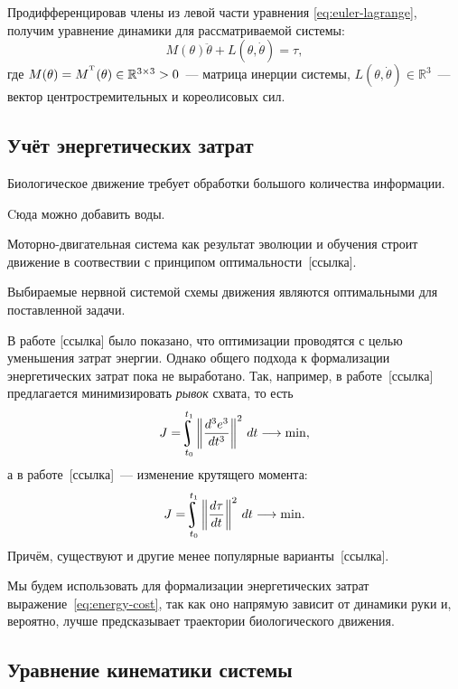 Продифференцировав члены из левой части уравнения \eqref{eq:euler-lagrange}, получим уравнение динамики для рассматриваемой системы:
\begin{equation}\label{eq:dynamic}
    M(\theta)\ddot\theta + L(\theta, \dot\theta) = \tau,
\end{equation}
где $M(\theta) = M^{^\mathrm{T}}(\theta) \in \mathbb{R}^{3 \times 3} > 0$~--- матрица инерции системы, $L(\theta, \dot\theta)\in\mathbb{R}^{3}$~--- вектор центростремительных и кореолисовых сил.


\subsection{Учёт энергетических затрат}

Биологическое движение требует обработки большого количества информации.

{\color{red} Cюда можно добавить воды.}

Моторно-двигательная система как результат эволюции и обучения строит движение в соотвествии с принципом оптимальности~[ссылка].

\begin{assertion}
    Выбираемые нервной системой схемы движения являются оптимальными для поставленной задачи.
\end{assertion}

В работе [ссылка] было показано, что оптимизации проводятся с целью уменьшения затрат энергии.
Однако общего подхода к формализации энергетических затрат пока не выработано.
Так, например, в работе~[ссылка] предлагается минимизировать \textit{рывок} схвата, то есть
$$
    J = \uint\limits_{t_0}^{t_1}\left\|
        \frac{d^3e^3}{dt^3}
    \right\|^2\, dt \longrightarrow \mathrm{min},
$$
а в работе~[ссылка]~--- изменение крутящего момента:
\begin{equation}\label{eq:energy-cost}
    J = \uint\limits_{t_0}^{t_1}\left\|
        \frac{d\tau}{dt}
    \right\|^2\, dt \longrightarrow \mathrm{min}.
\end{equation}
Причём, существуют и другие менее популярные варианты~[ссылка].

Мы будем использовать для формализации энергетических затрат выражение~\eqref{eq:energy-cost}, так как оно напрямую зависит от динамики руки и, вероятно, лучше предсказывает траектории биологического движения.

\subsection{Уравнение кинематики системы}

